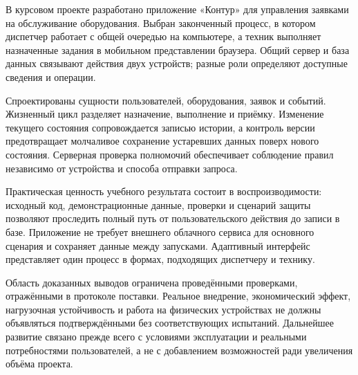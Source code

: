 \documentclass{timcw}
\begin{document}
\clearpage\conclusion

В курсовом проекте разработано приложение «Контур» для управления заявками на обслуживание оборудования. Выбран законченный процесс, в котором диспетчер работает с общей очередью на компьютере, а техник выполняет назначенные задания в мобильном представлении браузера. Общий сервер и база данных связывают действия двух устройств; разные роли определяют доступные сведения и операции.

Спроектированы сущности пользователей, оборудования, заявок и событий. Жизненный цикл разделяет назначение, выполнение и приёмку. Изменение текущего состояния сопровождается записью истории, а контроль версии предотвращает молчаливое сохранение устаревших данных поверх нового состояния. Серверная проверка полномочий обеспечивает соблюдение правил независимо от устройства и способа отправки запроса.

Практическая ценность учебного результата состоит в воспроизводимости: исходный код, демонстрационные данные, проверки и сценарий защиты позволяют проследить полный путь от пользовательского действия до записи в базе. Приложение не требует внешнего облачного сервиса для основного сценария и сохраняет данные между запусками. Адаптивный интерфейс представляет один процесс в формах, подходящих диспетчеру и технику.

Область доказанных выводов ограничена проведёнными проверками, отражёнными в протоколе поставки. Реальное внедрение, экономический эффект, нагрузочная устойчивость и работа на физических устройствах не должны объявляться подтверждёнными без соответствующих испытаний. Дальнейшее развитие связано прежде всего с условиями эксплуатации и реальными потребностями пользователей, а не с добавлением возможностей ради увеличения объёма проекта.
\end{document}
